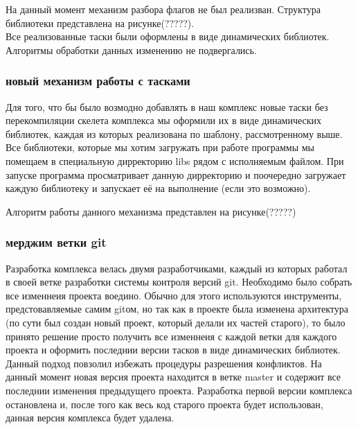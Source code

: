 На данный момент механизм разбора флагов не был реализван. Структура библиотеки представлена на рисунке(?????).\\

Все реализованные таски были оформлены в виде динамических библиотек. Алгоритмы обработки данных изменению не подвергались.

\subsubsection{новый механизм работы с тасками}

Для того, что бы было возмодно добавлять в наш комплекс новые таски без перекомпиляции скелета комплекса мы оформили их в виде динамических библиотек, каждая из которых реализована по шаблону, рассмотренному выше. Все библиотеки, которые мы хотим загружать при работе программы мы помещаем в специальную дирректорию libs рядом с исполняемым файлом. При запуске программа просматривает данную дирректорию и поочередно загружает каждую библиотеку и запускает её на выполнение (если это возможно). 

Алгоритм работы данного механизма представлен на рисунке(?????)\\

\subsubsection{мерджим ветки git}

Разработка комплекса велась двумя разработчиками, каждый из которых работал в своей ветке разработки системы контроля версий git. Необходимо было собрать все изменнеия проекта воедино. Обычно для этого используются инструменты, предстовавляемые самим gitом, но так как в проекте была изменена архитектура (по сути был создан новый проект, который делали их частей старого), то было принято решение просто получить все изменнеия с каждой ветки для каждого проекта и оформить последнии версии тасков в виде динамических библиотек. Данный подход повзолил избежать процедуры разрешения конфликтов. На данный момент новая версия проекта находится в ветке master и содержит все последнии изменения предыдущего проекта. Разработка первой версии комплекса остановлена и, после того как весь код старого проекта будет использован, данная версия комплекса будет удалена.
